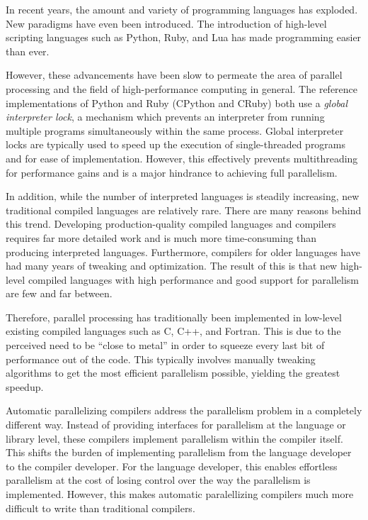\documentclass[
abstracton,
fontsize=12pt,
]{scrartcl}
\begin{document}
In recent years, the amount and variety of programming languages has exploded. New paradigms have even been introduced. The introduction of high-level scripting languages such as Python, Ruby, and Lua has made programming easier than ever.

However, these advancements have been slow to permeate the area of parallel processing and the field of high-performance computing in general. The reference implementations of Python and Ruby (CPython and CRuby) both use a \emph{global interpreter lock}, a mechanism which prevents an interpreter from running multiple programs simultaneously within the same process. Global interpreter locks are typically used to speed up the execution of single-threaded programs and for ease of implementation. However, this effectively prevents multithreading for performance gains and is a major hindrance to achieving full parallelism.

In addition, while the number of interpreted languages is steadily increasing, new traditional compiled languages are relatively rare. There are many reasons behind this trend. Developing production-quality compiled languages and compilers requires far more detailed work and is much more time-consuming than producing interpreted languages. Furthermore, compilers for older languages have had many years of tweaking and optimization. The result of this is that new high-level compiled languages with high performance and good support for parallelism are few and far between.

Therefore, parallel processing has traditionally been implemented in low-level existing compiled languages such as C, C++, and Fortran. This is due to the perceived need to be ``close to metal'' in order to squeeze every last bit of performance out of the code. This typically involves manually tweaking algorithms to get the most efficient parallelism possible, yielding the greatest speedup.

Automatic parallelizing compilers address the parallelism problem in a completely different way. Instead of providing interfaces for parallelism at the language or library level, these compilers implement parallelism within the compiler itself. This shifts the burden of implementing parallelism from the language developer to the compiler developer. For the language developer, this enables effortless parallelism at the cost of losing control over the way the parallelism is implemented. However, this makes automatic paralellizing compilers much more difficult to write than traditional compilers.
\end{document}
